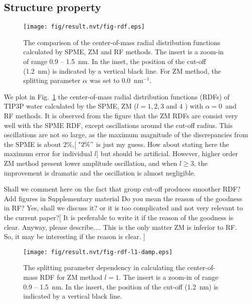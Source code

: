 \documentclass[a4paper,preprint,unsortedaddress,onecolumn,fleqn]{revtex4}
\begin{document}
\subsection{Structure property}

\begin{figure}[tbp]
\centering
\texttt{[image: fig/result.nvt/fig-rdf.eps]}
\caption{The comparison of the center-of-mass radial distribution functions
calculated by SPME, ZM and RF methods. The insert is a zoom-in of range 0.9
-- 1.5~nm. In the inset, the position of the cut-off (1.2~nm) is indicated
by a vertical black line. For ZM method, the splitting parameter $\protect%
\alpha $ was set to 0.0~$\text{nm}^{-1}$. }
\label{fig:rdf}
\end{figure}

We plot in Fig.~\ref{fig:rdf} the center-of-mass radial distribution
functions (RDFs) of TIP3P water calculated by the SPME, ZM ($l=1,2,3$ and $4$%
) with $\alpha =0$\ and RF methods. It is observed from the figure that the
ZM RDFs are consist very well with the SPME RDF, except oscillations around
the cut-off radius. This oscillations are not so large, as the maximum
magnitude of the discrepancies from the SPME is about $2\%$,{[} {\color{blue}
"$2\%"$ is just my guess. How about stating here the maximum error for
individual $l$}] but should be artificial. However, higher order ZM method
present lower amplitude oscillation, and when $l\geq 3$, the improvement is
dramatic and the oscillation is almost negligible.

{\color{red} Shall we comment here on the fact that group cut-off produces
smoother RDF? Add figures in Supplementary material {\color{blue} Do you
mean the reason of the goodness in RF?} {\color{red} Yes, shall we discuss
it? or it is too complicated and not very relevant to the current paper?}[} {%
\color{blue} It is preferable to write it if the reason of the goodness is
clear. Anyway, please describe.... This is the only matter ZM is inferior to
RF. So, it may be interesting if the reason is clear. }]

\begin{figure}[tbp]
\centering
\texttt{[image: fig/result.nvt/fig-rdf-l1-damp.eps]}
\caption{ The splitting parameter dependency in calculating the
center-of-mass RDF for ZM method $l=1$. The insert is a zoom-in of range 0.9
-- 1.5~nm. In the insert, the position of the cut-off (1.2~nm) is indicated
by a vertical black line. }
\label{fig:rdf-damp}
\end{figure}
\end{document}

